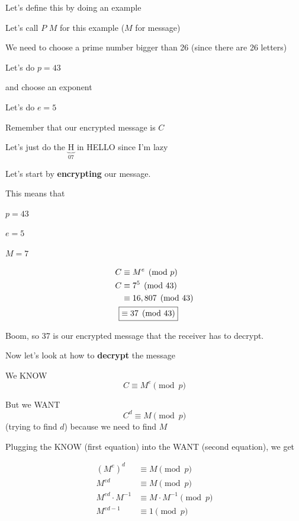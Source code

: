 \documentclass[../../Main.tex]{subfiles}
\begin{document}
\begin{definition}
    Let's define this by doing an example

    \begin{example}
        Let's call $P$ $M$ for this example ($M$ for message)

        We need to choose a prime number bigger than 26 (since there are 26 letters)

        Let's do $p = 43$

        and choose an exponent

        Let's do $e = 5$

        Remember that our encrypted message is $C$

        Let's just do the $\underbrace{\text{H}}_{07}$ in HELLO since I'm lazy

        Let's start by \textbf{encrypting} our message.

        This means that

        $p = 43$

        $e = 5$

        $M = 7$

        \begin{align*}
            C &\equiv M^e \pmod{p} \\
            C &\equiv 7^5 \pmod{43} \\
            &\equiv 16,807 \pmod{43} \\
            \Aboxed{&\equiv 37 \pmod{43}} \\
        \end{align*}

        Boom, so 37 is our encrypted message that the receiver has to decrypt.

        Now let's look at how to \textbf{decrypt} the message
 
        We KNOW $$C \equiv M^e \pmod{p}$$

        But we WANT $$C^d \equiv M \pmod{p}$$ (trying to find $d$) because we need to find $M$

        Plugging the KNOW (first equation) into the WANT (second equation), we get

        \begin{align*}
            \left(M^e\right)^d &\equiv M \pmod{p} \\
            M^{ed} &\equiv M \pmod{p} \\
            M^{ed} \cdot M^{-1} &\equiv M \cdot M^{-1} \pmod{p} \\
            M^{ed - 1} &\equiv 1 \pmod{p}
        \end{align*}


\end{example}
\end{definition}
\end{document}
